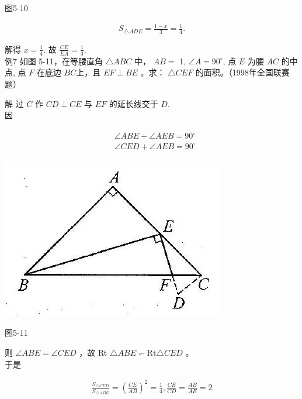 \documentclass[10pt]{article}
\begin{document}
图5-10

\begin{align*}
S_{\triangle A D E}=\frac{1-x}{3}=\frac{1}{4} .
\end{align*}

解得 $x=\frac{1}{4}$. 故 $\frac{C E}{E A}=\frac{1}{3}$.\\
例7 如图 5-11，在等腰直角 $\triangle A B C$ 中， $A B=$ 1, $\angle A=90^{\circ}$, 点 $E$ 为腰 $A C$ 的中点, 点 $F$ 在底边 $B C$上，且 $E F \perp B E$ 。求： $\triangle C E F$ 的面积。（1998年全国联赛题）

解 过 $C$ 作 $C D \perp C E$ 与 $E F$ 的延长线交于 $D$.\\
因

\begin{align*}
\begin{aligned}
& \angle A B E+\angle A E B=90^{\circ} \\
& \angle C E D+\angle A E B=90^{\circ}
\end{aligned}
\end{align*}

\begin{center}
\includegraphics[max width=\textwidth]{2024_10_30_2c8f45efd4a519b08e1ag-053(1)}
\end{center}

图5-11

则 $\angle A B E=\angle C E D$ ，故 Rt $\triangle A B E \backsim \mathrm{Rt} \triangle C E D$ 。\\
于是

\begin{align*}
\frac{S_{\triangle C E D}}{S_{\triangle A B E}}=\left(\frac{C E}{A B}\right)^{2}=\frac{1}{4}, \frac{C E}{C D}=\frac{A B}{A E}=2
\end{align*}
\end{document}
